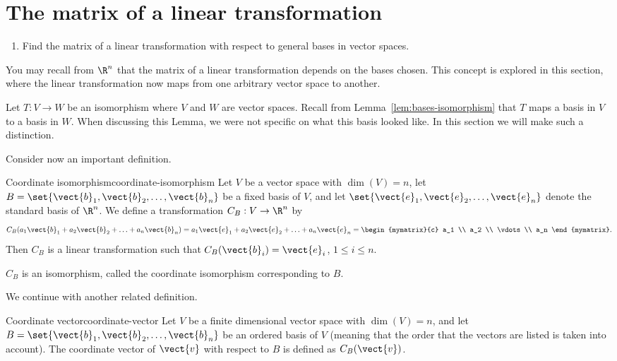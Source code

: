 \section{The matrix of a linear transformation}

\begin{outcome}
  \begin{enumerate}
  \item Find the matrix of a linear transformation with respect to
    general bases in vector spaces.
  \end{enumerate}
\end{outcome}

You may recall from $\R^n$ that the matrix of a linear transformation depends on the bases chosen. This concept is explored in this section, where the linear transformation now maps from one arbitrary vector space to another. 

Let $T: V \to W$ be an isomorphism where $V$ and $W$ are vector spaces. Recall from Lemma~\ref{lem:bases-isomorphism} that $T$ maps a basis in $V$ to a basis in $W$. When discussing this Lemma, we were not specific on what this basis looked like. In this section we will make such a distinction. 

Consider now an important definition.

\begin{definition}{Coordinate isomorphism}{coordinate-isomorphism}
Let $V$ be a vector space with $\dim(V)=n$, let $B=\set{\vect{b}_1, \vect{b}_2, \ldots, \vect{b}_n}$ be a fixed basis of $V$,
and let $\set{\vect{e}_1, \vect{e}_2, \ldots, \vect{e}_n}$
denote the standard basis of $\R^n$.
We define a transformation $C_B:V\to\R^n$ by
\[
C_B(a_1\vect{b}_1 + a_2\vect{b}_2 + \ldots + a_n\vect{b}_n)
=
a_1\vect{e}_1 + a_2\vect{e}_2 + \ldots + a_n\vect{e}_n
=
\begin{mymatrix}{c} a_1 \\ a_2 \\ \vdots \\ a_n
\end{mymatrix}.\]
Then $C_B$ is a linear transformation
such that
$C_B(\vect{b}_i)=\vect{e}_i$, $1\leq i\leq n$.

$C_B$ is an isomorphism, called
the coordinate isomorphism corresponding to $B$.
\end{definition}

We continue with another related definition.

\begin{definition}{Coordinate vector}{coordinate-vector}
Let $V$ be a finite dimensional vector space with $\dim(V)=n$, and
let $B=\set{\vect{b}_1, \vect{b}_2, \ldots, \vect{b}_n}$ be an ordered basis of $V$ (meaning that the order that the
vectors are listed is taken into account).
The coordinate vector of $\vect{v}$ with respect to $B$ is defined
as $C_B(\vect{v})$.
\end{definition}


